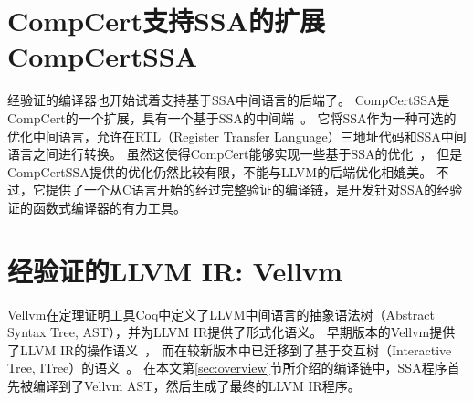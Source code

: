 \section{CompCert支持SSA的扩展CompCertSSA}

经验证的编译器也开始试着支持基于SSA中间语言的后端了。
CompCertSSA是CompCert的一个扩展，具有一个基于SSA的中间端~\cite{compcertssa}。
它将SSA作为一种可选的优化中间语言，允许在RTL（Register Transfer Language）三地址代码和SSA中间语言之间进行转换。
虽然这使得CompCert能够实现一些基于SSA的优化~\cite{compcertssa-op,blazy-cpp2023}，
但是CompCertSSA提供的优化仍然比较有限，不能与LLVM的后端优化相媲美。
不过，它提供了一个从C语言开始的经过完整验证的编译链，是开发针对SSA的经验证的函数式编译器的有力工具。

\section{经验证的LLVM IR: Vellvm}

Vellvm在定理证明工具Coq中定义了LLVM中间语言的抽象语法树（Abstract Syntax Tree, AST），并为LLVM IR提供了形式化语义。
早期版本的Vellvm提供了LLVM IR的操作语义~\cite{zhao2012formalizing}，
而在较新版本中已迁移到了基于交互树（Interactive Tree, ITree）的语义~\cite{zakowski2021modular}。
在本文第\ref{sec:overview}节所介绍的编译链中，SSA程序首先被编译到了Vellvm AST，然后生成了最终的LLVM IR程序。

